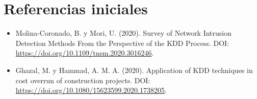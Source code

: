 \documentclass[12pt,a4paper]{article}
\begin{document}
\section{Referencias iniciales}
\begin{itemize}
\item Molina-Coronado, B. y Mori, U. (2020). Survey of Network Intrusion Detection Methods From the Perspective of the KDD Process. DOI: \url{https://doi.org/10.1109/tnsm.2020.3016246}.
\item Ghazal, M. y Hammad, A. M. A. (2020). Application of KDD techniques in cost overrun of construction projects. DOI: \url{https://doi.org/10.1080/15623599.2020.1738205}.
\end{itemize}
\end{document}
